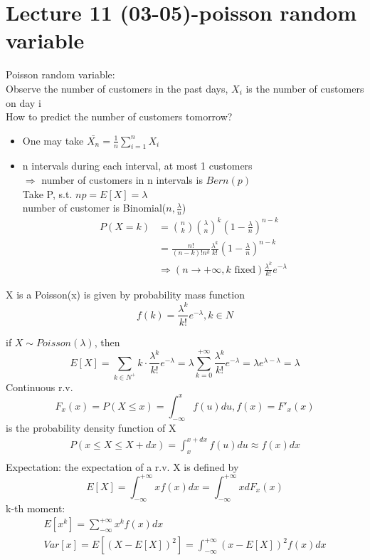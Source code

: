 \section{Lecture 11 (03-05)-{poisson random variable}}
Poisson random variable:
\\Observe the number of customers in the past days, $ X_i $ is the number of customers on day i
\\How to predict the number of customers tomorrow?
\begin{itemize}
\item One may take $ \bar{X_n}=\frac{1}{n}\sum_{i=1}^{n}X_i $ 
\item n intervals during each interval, at most 1 customers
\\$\Rightarrow$ number of customers in n intervals is $ Bern(p) $
\\Take P, s.t. $np=E[X]=\lambda$
\\number of customer is Binomial($ n,\frac{\lambda}{n} $)\begin{align*}{}{}
P(X=k)&=\binom{n}{k}\binom{\lambda}{n}^k(1-\frac{\lambda}{n})^{n-k}\\
&=\frac{n!}{(n-k)!n^k}\frac{\lambda^k}{k!}(1-\frac{\lambda}{n})^{n-k}\\
&\Rightarrow(n\rightarrow+\infty,k \text{ fixed})\frac{\lambda^k}{k!}e^{-\lambda}
\end{align*}
\end{itemize}
\begin{definition}[]{}
X is a Poisson(x) is given by probability mass function $$
    f(k)=\frac{\lambda^k}{k!}e^{-\lambda},k\in N
$$ 
\end{definition}
if $ X\sim Poisson(\lambda) $, then $$
    E[X]=\sum_{k\in N^+}k\cdot \frac{\lambda^k}{k!}e^{-\lambda}=\lambda \sum_{k=0}^{+\infty}\frac{\lambda^k}{k!}e^{-\lambda}=\lambda e^{\lambda-\lambda}=\lambda
$$ 
Continuous r.v.$$
    F_x(x)=P(X\leq x)=\int_{-\infty}^{x}f(u)du, f(x)=F'_x(x)
$$ is the probability density function of X\begin{align*}{}{}
P(x\leq X\leq X+dx)=\int_{x}^{x+dx}f(u)du\approx f(x)dx\\
\end{align*}
Expectation: the expectation of a r.v. X is defined by$$
    E[X]=\int_{-\infty}^{+\infty}xf(x)dx=\int_{-\infty}^{+\infty}xdF_x(x)
$$ 
k-th moment:\begin{align*}{}{}
E[x^k]=\sum_{-\infty}^{+\infty}x^kf(x)dx\\
Var[x]=E[(X-E[X])^2]=\int_{-\infty}^{+\infty}(x-E[X])^2f(x)dx
\end{align*}
